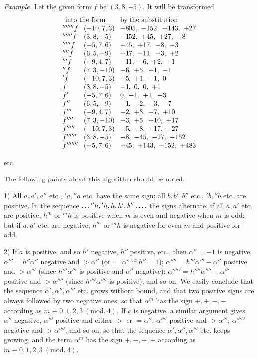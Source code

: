 \textit{Example.} Let the given form $f$ be $(3,8,-5)$. It will be transformed
\[
\setlength{\arraycolsep}{4pt}
\begin{array}{@{}lll@{}}
\multicolumn{2}{l}{\text{into the form}}&\text{by the substitution}\\
{}'''''''f&(-10,7,3)&-805,\ -152,\ +143,\ +27\\
{}''''''f&(3,8,-5)&-152,\ +45,\ +27,\ -8\\
{}'''''f&(-5,7,6)&+45,\ +17,\ -8,\ -3\\
{}''''f&(6,5,-9)&+17,\ -11,\ -3,\ +2\\
{}'''f&(-9,4,7)&-11,\ -6,\ +2,\ +1\\
{}''f&(7,3,-10)&-6,\ +5,\ +1,\ -1\\
{}'f&(-10,7,3)&+5,\ +1,\ -1,\ 0\\
f&(3,8,-5)&+1,\ 0,\ 0,\ +1\\
f'&(-5,7,6)&0,\ -1,\ +1,\ -3\\
f''&(6,5,-9)&-1,\ -2,\ -3,\ -7\\
f'''&(-9,4,7)&-2,\ +3,\ -7,\ +10\\
f''''&(7,3,-10)&+3,\ +5,\ +10,\ +17\\
f'''''&(-10,7,3)&+5,\ -8,\ +17,\ -27\\
f''''''&(3,8,-5)&-8,\ -45,\ -27,\ -152\\
f'''''''&(-5,7,6)&-45,\ +143,\ -152,\ +483
\end{array}
\]
\centerline{etc.}


The following points about this algorithm should be noted.

1) All $a,a',a''$ etc., ${}'a,{}''a$ etc. have the same sign; all $b,b',b''$ etc., ${}'b,{}''b$ etc. are positive. In the sequence $\mathinner{\ldotp\ldotp\ldotp} {}''h,{}'h,h,h',h''\mathinner{\ldotp\ldotp\ldotp\ldotp}$ the signs alternate: if all $a,a'$ etc. are positive, $h^m$ or ${}^m h$ is positive when $m$ is even and negative when $m$ is odd; but if $a,a'$ etc. are negative, $h^m$ or ${}^m h$ is negative for even $m$ and positive for odd.

2) If $a$ is positive, and so $h'$ negative, $h''$ positive, etc., then $\alpha''=-1$ is negative, $\alpha'''=h''\alpha''$ negative and $>\alpha''$ (or $=\alpha''$ if $h''=1$); $\alpha''''=h'''\alpha'''-\alpha''$ positive and $>\alpha'''$ (since $h'''\alpha'''$ is positive and $\alpha''$ negative); $\alpha'''''=h''''\alpha''''-\alpha'''$ positive and $>\alpha''''$ (since $h''''\alpha''''$ is positive), and so on. We easily conclude that the sequence $\alpha',\alpha'',\alpha'''$ etc. grows without bound, and that two positive signs are always followed by two negative ones, so that $\alpha^m$ has the sign $+,+,-,-$ according as $m\equiv0,1,2,3\ (\mathrm{mod.}\ 4)$. If $a$ is negative, a similar argument gives $\alpha''$ negative, $\alpha'''$ positive and either $>$ or $=\alpha''$; $\alpha''''$ positive and $>\alpha'''$; $\alpha'''''$ negative and $>\alpha''''$, and so on,
so that the sequence $\alpha',\alpha'',\alpha'''$ etc. keeps growing, and the term $\alpha^m$ has the sign $+,-,-,+$ according as $m\equiv0,1,2,3\ (\mathrm{mod.}\ 4)$.

